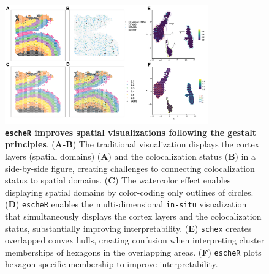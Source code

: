 \documentclass[11pt]{article}
\begin{document}
\clearpage

\begin{figure}[13]
\begin{center}
\includegraphics[width=0.78\textwidth]{Manuscript/figure/fig_grid.png}
\end{center}
\caption{\footnotesize \textbf{\texttt{escheR} improves spatial visualizations following the gestalt principles}. (\textbf{A-B}) The traditional visualization displays the cortex layers (spatial domains) (\textbf{A}) and the colocalization status (\textbf{B}) in a side-by-side figure, creating challenges to connecting colocalization status to spatial domains. (\textbf{C}) The watercolor effect enables displaying spatial domains by color-coding only outlines of circles. (\textbf{D}) \texttt{escheR} enables the multi-dimensional \texttt{in-situ} visualization that simultaneously displays the cortex layers and the colocalization status, substantially improving interpretability. (\textbf{E}) \texttt{schex} creates overlapped convex hulls, creating confusion when interpreting cluster memberships of hexagons in the overlapping areas. (\textbf{F}) \texttt{escheR} plots hexagon-specific membership to improve interpretability.}
\label{fig:visual} 
\end{figure}


\clearpage 

\end{document}
